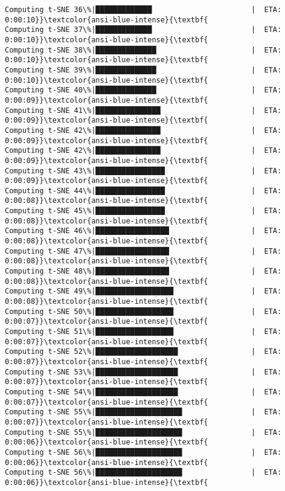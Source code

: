 \documentclass[11pt]{article}
\begin{document}
\begin{Verbatim}[commandchars=\\\{\}]
Computing t-SNE 36\%|█████████████                       |  ETA: 0:00:10}}\textcolor{ansi-blue-intense}{\textbf{
Computing t-SNE 37\%|█████████████                       |  ETA: 0:00:10}}\textcolor{ansi-blue-intense}{\textbf{
Computing t-SNE 38\%|██████████████                      |  ETA: 0:00:10}}\textcolor{ansi-blue-intense}{\textbf{
Computing t-SNE 39\%|██████████████                      |  ETA: 0:00:10}}\textcolor{ansi-blue-intense}{\textbf{
Computing t-SNE 40\%|██████████████                      |  ETA: 0:00:09}}\textcolor{ansi-blue-intense}{\textbf{
Computing t-SNE 41\%|███████████████                     |  ETA: 0:00:09}}\textcolor{ansi-blue-intense}{\textbf{
Computing t-SNE 42\%|███████████████                     |  ETA: 0:00:09}}\textcolor{ansi-blue-intense}{\textbf{
Computing t-SNE 42\%|███████████████                     |  ETA: 0:00:09}}\textcolor{ansi-blue-intense}{\textbf{
Computing t-SNE 43\%|████████████████                    |  ETA: 0:00:09}}\textcolor{ansi-blue-intense}{\textbf{
Computing t-SNE 44\%|████████████████                    |  ETA: 0:00:08}}\textcolor{ansi-blue-intense}{\textbf{
Computing t-SNE 45\%|████████████████                    |  ETA: 0:00:08}}\textcolor{ansi-blue-intense}{\textbf{
Computing t-SNE 46\%|█████████████████                   |  ETA: 0:00:08}}\textcolor{ansi-blue-intense}{\textbf{
Computing t-SNE 47\%|█████████████████                   |  ETA: 0:00:08}}\textcolor{ansi-blue-intense}{\textbf{
Computing t-SNE 48\%|█████████████████                   |  ETA: 0:00:08}}\textcolor{ansi-blue-intense}{\textbf{
Computing t-SNE 49\%|██████████████████                  |  ETA: 0:00:08}}\textcolor{ansi-blue-intense}{\textbf{
Computing t-SNE 50\%|██████████████████                  |  ETA: 0:00:07}}\textcolor{ansi-blue-intense}{\textbf{
Computing t-SNE 51\%|██████████████████                  |  ETA: 0:00:07}}\textcolor{ansi-blue-intense}{\textbf{
Computing t-SNE 52\%|███████████████████                 |  ETA: 0:00:07}}\textcolor{ansi-blue-intense}{\textbf{
Computing t-SNE 53\%|███████████████████                 |  ETA: 0:00:07}}\textcolor{ansi-blue-intense}{\textbf{
Computing t-SNE 54\%|███████████████████                 |  ETA: 0:00:07}}\textcolor{ansi-blue-intense}{\textbf{
Computing t-SNE 55\%|████████████████████                |  ETA: 0:00:07}}\textcolor{ansi-blue-intense}{\textbf{
Computing t-SNE 55\%|████████████████████                |  ETA: 0:00:06}}\textcolor{ansi-blue-intense}{\textbf{
Computing t-SNE 56\%|████████████████████                |  ETA: 0:00:06}}\textcolor{ansi-blue-intense}{\textbf{
Computing t-SNE 56\%|████████████████████                |  ETA: 0:00:06}}\textcolor{ansi-blue-intense}{\textbf{

\end{Verbatim}
\end{document}
